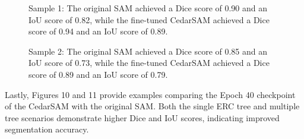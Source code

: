 \documentclass[letterpaper, 10 pt, conference]{ieeeconf}  %
\begin{document}
\begin{figure}[thpb]
  \centering
  \caption{Sample 1: The original SAM achieved a Dice score of 0.90 and an IoU score of 0.82, while the fine-tuned CedarSAM achieved a Dice score of 0.94 and an IoU score of 0.89.}
  \label{fig:score_distributions}
\end{figure}

\begin{figure}[thpb]
  \centering
  \caption{Sample 2: The original SAM achieved a Dice score of 0.85 and an IoU score of 0.73, while the fine-tuned CedarSAM achieved a Dice score of 0.89 and an IoU score of 0.79.}
  \label{fig:score_distributions}
\end{figure}

Lastly, Figures 10 and 11 provide examples comparing the Epoch 40 checkpoint of the CedarSAM with the original SAM. Both the single ERC tree and multiple tree scenarios demonstrate higher Dice and IoU scores, indicating improved segmentation accuracy.
\end{document}
